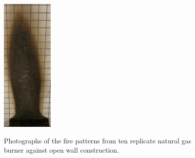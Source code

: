 \documentclass[twoside]{uocthesis}
\begin{document}
\begin{figure}[p]
	\includegraphics[width=1.0in]{../Figures/GBNG13_P5120356} \\

	\caption[Photographs of the fire patterns from ten replicate natural gas burner against open wall construction]{Photographs of the fire patterns from ten replicate natural gas burner against open wall construction.}
	\label{NG_Open_Wall}
\end{figure}
\end{document}
